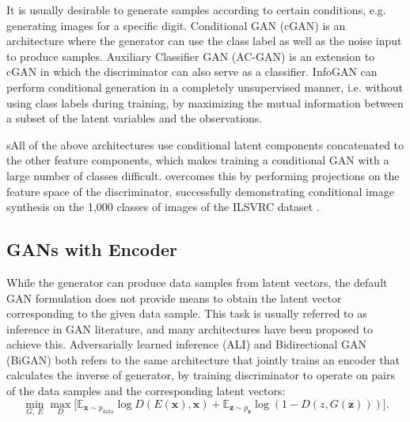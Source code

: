 It is usually desirable to generate samples according to certain conditions, e.g. generating images for a specific digit.
Conditional GAN (cGAN) \cite{mirza2014conditional} is an architecture where the generator can use the class label as well as the noise input to produce samples.
Auxiliary Classifier GAN (AC-GAN) \cite{odena2016acgan} is an extension to cGAN in which the discriminator can also serve as a classifier.
InfoGAN \cite{chen2016infogan} can perform conditional generation in a completely unsupervised manner, i.e. without using class labels during training, by maximizing the mutual information between a subset of the latent variables and the observations.

sAll of the above architectures use conditional latent components concatenated to the other feature components, which makes training a conditional GAN with a large number of classes difficult.
\cite{miyato2018cgan} overcomes this by performing projections on the feature space of the discriminator, successfully demonstrating conditional image synthesis on the 1,000 classes of images of the ILSVRC dataset \cite{russakovsky2015imagenet}.


\subsection{GANs with Encoder}\label{subsec:gan-encoder}

While the generator can produce data samples from latent vectors, the default GAN formulation does not provide means to obtain the latent vector corresponding to the given data sample.
This task is usually referred to as inference in GAN literature, and many architectures have been proposed to achieve this.
Adversarially learned inference (ALI) \cite{dumoulin2017ali} and Bidirectional GAN (BiGAN) \cite{donahue2016bigan} both refers to the same architecture that jointly trains an encoder that calculates the inverse of generator, by training discriminator to operate on pairs of the data samples and the corresponding latent vectors:
\begin{equation}\label{eqn:bigan}
\min_{G,~E} \max_{D} \Big[ \mathbb{E}_{\bm{x} \sim p_{\mathrm{data}}} {\log D(E(\bm{x}), \bm{x})} + \mathbb{E}_{\bm{z} \sim p_{\bm{z}}} \log \left ( 1 - D(z, G(\bm{z})) \right ) \Big].
\end{equation}

